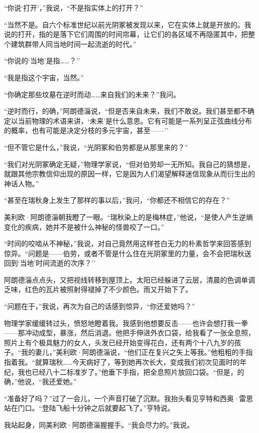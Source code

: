 \documentclass[AutoFakeBold=true]{book}
\begin{document}
``你说`打开'，''我说，``不是指实体上的打开？''

``当然不是。自六个标准世纪以前光阴冢被发现以来，它在实体上就是开放的。我说的打开，指的是落下它们周围的时间帘幕，让它们的各区域不再隐匿其中，把整个建筑群带人同当地时间一起流逝的时代。''

``你说的`当地'是指……？''

``我是指这个宇宙，当然。''

``你确定那些坟墓在逆时而动……来自我们的未来？''我问。

``逆时而行，的确，''阿朗德淄说，``但是否来自未来，我们不敢说。我们甚至都不确定以当前物理的术语来讲，`未来'是什么意思。它有可能是一系列呈正弦曲线分布的概率，也有可能是决定分枝的多元宇宙，甚至——''

``但不管它是什么，''我说，``光阴冢和伯劳都是从那里来的？''

``我们对光阴冢确定无疑，''物理学家说，``但对伯劳却一无所知。我自己的猜想是，就跟其他宗教信仰出现的原因一样，它是因为人们渴望解释迷信现象从而衍生出的神话人物。''

``甚至在瑞秋身上发生了那样的事以后，''我问，``你都还不相信它的存在？''

美利欧·阿朗德淄朝我瞪了一眼。``瑞秋染上的是梅林症，''他说，``是使人产生逆熵变化的疾病，她并不是被什么神秘的怪兽咬了一口。''

``时间的咬啮从不神秘，''我说，对自己竟然用这样苍白无力的朴素哲学来回答感到惊异。``问题是——伯劳，或者不管是什么住在光阴冢里的力量，会不会把瑞秋送回到`当地'时间流逝的次序？''

阿朗德淄点点头，又把视线转移到屋顶上。太阳已经躲进了云层，清晨的色调单调乏味，红色的瓦片被照射得褪掉了不少颜色。雨又开始下了。

``问题在于，''我说，再次为自己的话感到惊异，``你还爱她吗？''

物理学家缓缓转过头，愤怒地瞪着我。我感到他想要反击——也许会想打我一拳——那冲动成型，暴涨，然后消退。他把手伸进外衣口袋，给我看了一张全息照，照片上有个极具魅力的女人，头发已经开始变得花白，还有两个十八九岁的孩子。``我的妻儿，''美利欧·阿朗德淄说，``他们正在复兴之矢上等我。''他粗粗的手指指着我。``就算瑞秋……今天病好了，等到她再次长大，变成我们初次见面时的年纪，我也已经八十二标准岁了。''他垂下手指，把全息照片放回口袋。``但是，的确，''他说，``我还爱她。''

``准备好了吗？''过了一会儿，一个声音打破了沉默。我抬头看见亨特和西奥·雷恩站在门口。``登陆飞船十分钟之后就要起飞了。''亨特说。

我站起身，同美利欧·阿朗德淄握握手。``我会尽力的。''我说。
\end{document}
